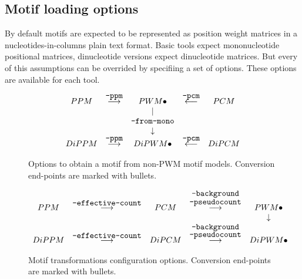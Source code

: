 \subsection{Motif loading options}
By default motifs are expected to be represented as position weight matrices in a nucleotides-in-columns plain text format. Basic tools expect mononucleotide positional matrices, dinucleotide versions expect dinucleotide matrices. But every of this assumptions can be overrided by specifiing a set of options. These options are available for each tool.


\begin{figure}[h]
\centering
$$\begin{array}{ccccc}
PPM     &  \stackrel{\mbox{\texttt{--ppm}}}{\longrightarrow}  & PWM \bullet               & \stackrel{\mbox{\texttt{--pcm}}}{\longleftarrow}  &  PCM  \\
        &                                                 &          |                &                                               &  \\
        &                                                 & \mbox{\texttt{--from-mono}}   &                                               &  \\
        &                                                 &     \downarrow            &                                               &  \\
DiPPM   &  \stackrel{\mbox{\texttt{--ppm}}}{\longrightarrow}  & DiPWM \bullet             & \stackrel{\mbox{\texttt{--pcm}}}{\longleftarrow}  &  DiPCM
\end{array}$$
\caption{Options to obtain a motif from non-PWM motif models. Conversion end-points are marked with bullets.}\label{motif-conversion-types}
\end{figure}


\begin{figure}[h]
\centering
$$\begin{array}{ccccc}
PPM   & \stackrel{\mbox{\texttt{--effective-count}}}{\longrightarrow} & PCM   & \stackrel{\mbox{\texttt{--background}}}{\stackrel{\mbox{\texttt{--pseudocount}}}{\longrightarrow}} & PWM \bullet \\
      &                                                           &       &                                                                                            & \downarrow \\
DiPPM & \stackrel{\mbox{\texttt{--effective-count}}}{\longrightarrow} & DiPCM & \stackrel{\stackrel{\mbox{\texttt{--background}}}{\mbox{\texttt{--pseudocount}}}}{\longrightarrow} & DiPWM \bullet
\end{array}$$
\caption{Motif transformations configuration options. Conversion end-points are marked with bullets.}\label{motif-conversion-configuration}
\end{figure}


